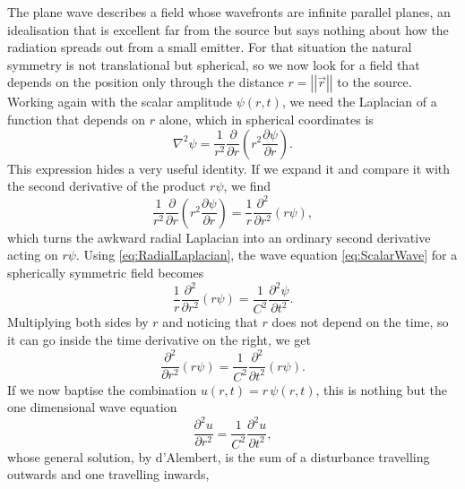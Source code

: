        The plane wave describes a field whose wavefronts are infinite parallel planes, an idealisation that is excellent far from the source but says nothing about how the radiation spreads out from a small emitter. For that situation the natural symmetry is not translational but spherical, so we now look for a field that depends on the position only through the distance $r = \left|\left|\vec{r}\right|\right|$ to the source. Working again with the scalar amplitude $\psi(r,t)$, we need the Laplacian of a function that depends on $r$ alone, which in spherical coordinates is
       \begin{equation*}
            \nabla^2\psi = \frac{1}{r^2}\frac{\partial}{\partial r}\left(r^2\frac{\partial\psi}{\partial r}\right).
       \end{equation*}
       This expression hides a very useful identity. If we expand it and compare it with the second derivative of the product $r\psi$, we find
       \begin{equation}\label{eq:RadialLaplacian}
            \frac{1}{r^2}\frac{\partial}{\partial r}\left(r^2\frac{\partial\psi}{\partial r}\right) = \frac{1}{r}\frac{\partial^2}{\partial r^2}\left(r\psi\right),
       \end{equation}
       which turns the awkward radial Laplacian into an ordinary second derivative acting on $r\psi$. Using \ref{eq:RadialLaplacian}, the wave equation \ref{eq:ScalarWave} for a spherically symmetric field becomes
       \begin{equation*}
            \frac{1}{r}\frac{\partial^2}{\partial r^2}\left(r\psi\right) = \frac{1}{C^2}\frac{\partial^2\psi}{\partial t^2}.
       \end{equation*}
       Multiplying both sides by $r$ and noticing that $r$ does not depend on the time, so it can go inside the time derivative on the right, we get
       \begin{equation*}
            \frac{\partial^2}{\partial r^2}\left(r\psi\right) = \frac{1}{C^2}\frac{\partial^2}{\partial t^2}\left(r\psi\right).
       \end{equation*}
       If we now baptise the combination $u(r,t) = r\,\psi(r,t)$, this is nothing but the one dimensional wave equation
       \begin{equation}\label{eq:OneDimWave}
            \frac{\partial^2 u}{\partial r^2} = \frac{1}{C^2}\frac{\partial^2 u}{\partial t^2},
       \end{equation}
       whose general solution, by d'Alembert, is the sum of a disturbance travelling outwards and one travelling inwards,

